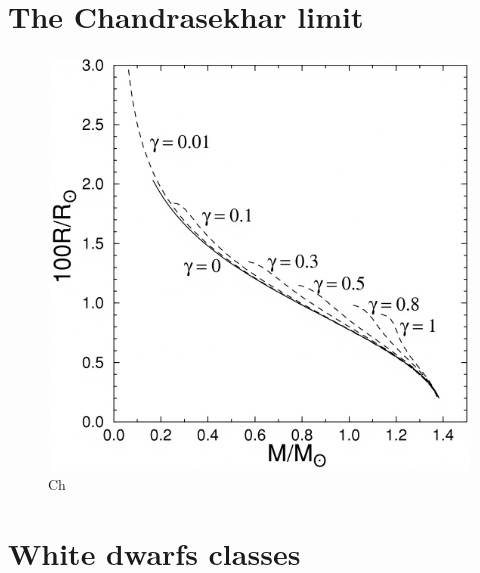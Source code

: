 \documentclass[oneside,a4paper,11pt]{report}
\begin{document}
\section{The Chandrasekhar limit}

\begin{figure}[hbt!]
\centering
\includegraphics[totalheight=8cm]{plot/chlimit}
\caption{Ch \citet{2000ApJ...530..949S} }
\label{Chlimit1} 
\end{figure}




\section{White dwarfs classes}
\end{document}
